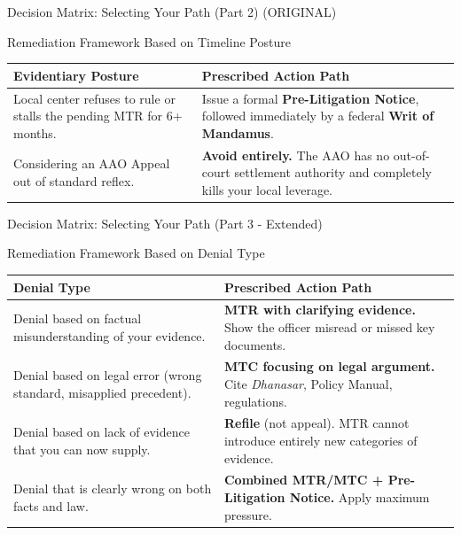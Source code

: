 \documentclass[11pt]{beamer}
\begin{document}
	\begin{frame}{Decision Matrix: Selecting Your Path (Part 2) (ORIGINAL)}
		\scriptsize
		\begin{block}{Remediation Framework Based on Timeline Posture}
			\centering
			\begin{tabular}{|p{4cm}|p{6.5cm}|}
				\hline
				\textbf{Evidentiary Posture} & \textbf{Prescribed Action Path} \\
				\hline
				Local center refuses to rule or stalls the pending MTR for 6+ months. & Issue a formal \textbf{Pre-Litigation Notice}, followed immediately by a federal \textbf{Writ of Mandamus}. \\
				\hline
				Considering an AAO Appeal out of standard reflex. & \textbf{Avoid entirely.} The AAO has no out-of-court settlement authority and completely kills your local leverage. \\
				\hline
			\end{tabular}
		\end{block}
	\end{frame}
	
	
	\begin{frame}{Decision Matrix: Selecting Your Path (Part 3 - Extended)}
		\scriptsize
		\begin{block}{Remediation Framework Based on Denial Type}
			\centering
			\begin{tabular}{|p{4cm}|p{6.5cm}|}
				\hline
				\textbf{Denial Type} & \textbf{Prescribed Action Path} \\
				\hline
				Denial based on factual misunderstanding of your evidence. & \textbf{MTR with clarifying evidence.} Show the officer misread or missed key documents. \\
				\hline
				Denial based on legal error (wrong standard, misapplied precedent). & \textbf{MTC focusing on legal argument.} Cite \textit{Dhanasar}, Policy Manual, regulations. \\
				\hline
				Denial based on lack of evidence that you can now supply. & \textbf{Refile} (not appeal). MTR cannot introduce entirely new categories of evidence. \\
				\hline
				Denial that is clearly wrong on both facts and law. & \textbf{Combined MTR/MTC + Pre-Litigation Notice.} Apply maximum pressure. \\
				\hline
			\end{tabular}
		\end{block}
	\end{frame}
	
\end{document}
